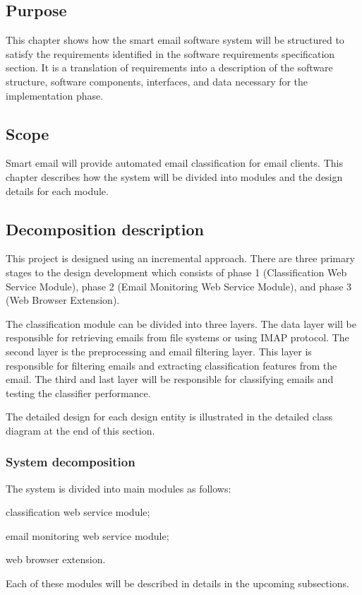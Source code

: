 \subsection{Purpose}
This chapter shows how the smart email software system will be 
structured to satisfy the requirements identified in the software
requirements specification section. It is a translation of 
requirements into a description of the software structure, software components, 
interfaces, and data necessary for the implementation phase.

\subsection{Scope}
Smart email will provide automated email classification for email clients. 
This chapter describes how the system will be divided into modules and 
the design details for each module.


\subsection{Decomposition description}
This project is designed using an incremental approach. There are three
primary  stages to the design development which consists of phase 1 
(Classification Web Service Module), phase 2 (Email Monitoring Web Service Module),
and phase 3 (Web Browser Extension).

The classification module can be divided into three layers. The data layer will be 
responsible for retrieving emails from file systems or using IMAP protocol. The 
second layer is the preprocessing and email filtering layer. This layer is 
responsible for filtering emails and extracting classification features from the 
email. The third and last layer will be responsible for classifying emails and 
testing the classifier performance.

The detailed design for each design entity is illustrated in the detailed class 
diagram at the end of this section.

\subsubsection{System decomposition}
The system is divided into main modules as follows:
\begin{my_itemize}
  \item classification web service module;
  \item email monitoring web service module;
  \item web browser extension.
\end{my_itemize}
Each of these modules will be described in details in the upcoming subsections.


